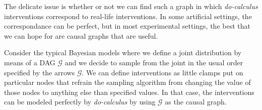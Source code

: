 \documentclass[a4paper, 10pt]{article}
\newcommand{\comment}[1]{\textbf{(#1)}}
\begin{document}
The delicate issue is whether or not we can find such a graph in which
\textit{do-calculus} interventions correspond to real-life interventions. In
some artificial settings, the correspondance can be perfect, but in most
experimental settings, the best that we can hope for are causal graphs that are
useful.

Consider the typical Bayesian models where we define a joint distribution by
means of a DAG $\mathcal{G}$ and we decide to sample from the joint in the
usual order specified by the arrows $\mathcal{G}$. We can define interventions
as little clamps put on particular nodes that refrain the sampling algorithm
from changing the value of those nodes to anything else than specified values.
In that case, the interventions can be modeled perfectly by \textit{do-calculus}
by using $\mathcal{G}$ as the causal graph.



% 
% 
\end{document}
